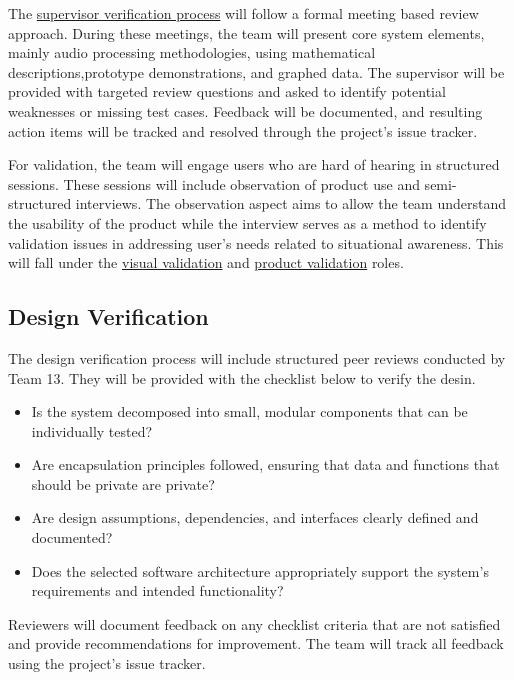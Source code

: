 \documentclass[12pt, titlepage]{article}
\begin{document}
The 
\hyperref[role:audio_processing_verification]{supervisor verification process}
will follow a formal meeting based review approach. During these meetings,
the team will present core system elements, mainly audio processing
methodologies, using mathematical descriptions,prototype demonstrations,
and graphed data. The supervisor will be provided with targeted review
questions and asked to identify potential weaknesses or missing test cases.
Feedback will be documented, and resulting action items will be tracked
and resolved through the project's issue tracker. \newline


For validation, the team will engage users who are hard of hearing in structured
sessions. These sessions will include observation of product use and
semi-structured interviews. The observation aspect aims to allow the team
understand the usability of the product while the interview serves as a method 
to identify validation issues in addressing user's needs related to situational
awareness. This will fall under the 
\hyperref[role:visual_vnv]{visual validation} and
\hyperref[role:product_validation]{product validation} roles.

\subsection{Design Verification}

The design verification process will include structured peer reviews conducted
by Team 13. They will be provided with the checklist below to verify the desin.

\begin{itemize}
  \item Is the system decomposed into small, modular components that can be
  individually tested?

  \item Are encapsulation principles followed, ensuring that data and functions
  that should be private are private?

  \item Are design assumptions, dependencies, and interfaces clearly defined
  and documented?

  \item Does the selected software architecture appropriately support the
  system's requirements and intended functionality?
\end{itemize}

Reviewers will document feedback on any checklist criteria that are not
satisfied and provide recommendations for improvement. The team will track all 
feedback using the project's issue tracker.
\end{document}
